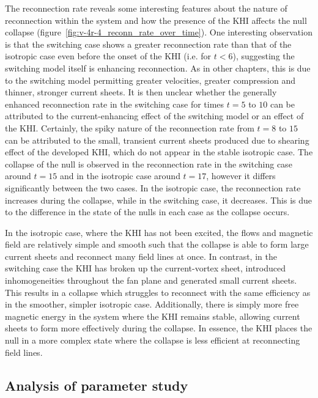 The reconnection rate reveals some interesting features about the nature of reconnection within the system and how the presence of the KHI affects the null collapse (figure~\ref{fig:v-4r-4_reconn_rate_over_time}). One interesting observation is that the switching case shows a greater reconnection rate than that of the isotropic case even before the onset of the KHI (i.e. for $t < 6$), suggesting the switching model itself is enhancing reconnection. As in other chapters, this is due to the switching model permitting greater velocities, greater compression and thinner, stronger current sheets. It is then unclear whether the generally enhanced reconnection rate in the switching case for times $t=5$ to $10$ can be attributed to the current-enhancing effect of the switching model or an effect of the KHI. Certainly, the spiky nature of the reconnection rate from $t=8$ to $15$ can be attributed to the small, transient current sheets produced due to shearing effect of the developed KHI, which do not appear in the stable isotropic case. The collapse of the null is observed in the reconnection rate in the switching case around $t=15$ and in the isotropic case around $t=17$, however it differs significantly between the two cases. In the isotropic case, the reconnection rate increases during the collapse, while in the switching case, it decreases. This is due to the difference in the state of the nulls in each case as the collapse occurs.

In the isotropic case, where the KHI has not been excited, the flows and magnetic field are relatively simple and smooth such that the collapse is able to form large current sheets and reconnect many field lines at once. In contrast, in the switching case the KHI has broken up the current-vortex sheet, introduced inhomogeneities throughout the fan plane and generated small current sheets. This results in a collapse which struggles to reconnect with the same efficiency as in the smoother, simpler isotropic case. Additionally, there is simply more free magnetic energy in the system where the KHI remains stable, allowing current sheets to form more effectively during the collapse. In essence, the KHI places the null in a more complex state where the collapse is less efficient at reconnecting field lines.

\subsection{Analysis of parameter study}

